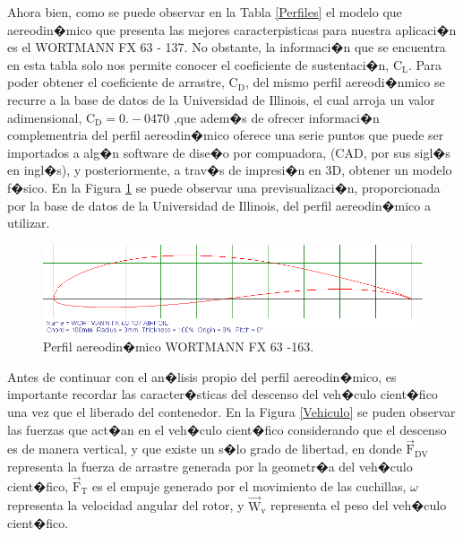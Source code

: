 \documentclass[10pt,a4paper]{book}
\begin{document}
Ahora bien, como se puede observar en la Tabla \ref{Perfiles} el modelo que aereodin�mico que presenta las mejores caracterpisticas para nuestra aplicaci�n es el WORTMANN FX 63 - 137. No obstante, la informaci�n que se encuentra en esta tabla solo nos permite conocer el coeficiente de sustentaci�n, $\text{C}_{\text{L}}$. Para poder obtener el coeficiente de arrastre, $\text{C}_{\text{D}}$, del mismo perfil aereodi�nmico se recurre a la base de datos de la Universidad de Illinois, el cual arroja un valor adimensional, $\text{C}_{\text{D}} = 0{.}-0470$ ,que adem�s de ofrecer informaci�n complementria del perfil aereodin�mico oferece una serie puntos que puede ser importados a alg�n software de dise�o por compuadora, (CAD, por sus sigl�s en ingl�s), y posteriormente, a trav�s de impresi�n en 3D, obtener un modelo f�sico. En la Figura \ref{fig:Plot} se puede observar una previsualizaci�n, proporcionada por la base de datos de la Universidad de Illinois, del perfil aereodin�mico a utilizar.
\begin{figure}[H]
\begin{center}
\includegraphics[scale=0.8]{Imagenes/Plot.eps}  
\caption{Perfil aereodin�mico WORTMANN FX 63 -163. \label{fig:Plot}}
\end{center}
\end{figure}
Antes de continuar con el an�lisis propio del perfil aereodin�mico, es importante recordar las caracter�sticas del descenso del veh�culo cient�fico una vez que el liberado del contenedor. En la Figura \ref{Vehiculo} se puden observar las fuerzas que act�an en el veh�culo cient�fico considerando que el descenso es de manera vertical, y que existe un s�lo grado de libertad, en donde $\overrightarrow{\text{F}}_{\text{DV}}$ representa la fuerza de arrastre generada por la geometr�a del veh�culo cient�fico, $\overrightarrow{\text{F}}_{\text{T}}$ es el empuje generado por el movimiento de las cuchillas, $\omega$ representa la velocidad angular del rotor, y $\overrightarrow{\text{W}}_{\text{v}}$ representa el peso del veh�culo cient�fico.
\end{document}

